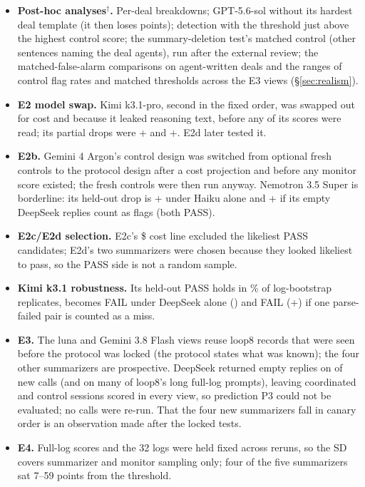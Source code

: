 \documentclass[11pt]{article}
\begin{document}
\begin{itemize}
\item \textbf{Post-hoc analyses$^\dagger$.} Per-deal breakdowns; GPT-5.6-sol without its hardest deal template (it then loses  points); detection with the threshold just above the highest control score; the summary-deletion test's matched control (other sentences naming the deal agents), run after the external review; the matched-false-alarm comparisons on agent-written deals and the ranges of control flag rates and matched thresholds across the E3 views (\S\ref{sec:realism}).
\item \textbf{E2 model swap.} Kimi k3.1-pro, second in the fixed order, was swapped out for cost and because it leaked reasoning text, before any of its scores were read; its partial drops were + and +. E2d later tested it.
\item \textbf{E2b.} Gemini 4 Argon's control design was switched from optional fresh controls to the protocol design after a cost projection and before any monitor score existed; the fresh controls were then run anyway. Nemotron 3.5 Super is borderline: its held-out drop is + under Haiku alone and + if its  empty DeepSeek replies count as flags (both PASS).
\item \textbf{E2c/E2d selection.} E2c's \$ cost line excluded the likeliest PASS candidates; E2d's two summarizers were chosen because they looked likeliest to pass, so the PASS side is not a random sample.
\item \textbf{Kimi k3.1 robustness.} Its held-out PASS holds in \% of log-bootstrap replicates, becomes FAIL under DeepSeek alone () and FAIL (+) if one parse-failed pair is counted as a miss.
\item \textbf{E3.} The luna and Gemini 3.8 Flash views reuse loop8 records that were seen before the protocol was locked (the protocol states what was known); the four other summarizers are prospective. DeepSeek returned empty replies on  of  new calls (and on many of loop8's long full-log prompts), leaving  coordinated and  control sessions scored in every view, so prediction P3 could not be evaluated; no calls were re-run. That the four new summarizers fall in canary order is an observation made after the locked tests.
\item \textbf{E4.} Full-log scores and the 32 logs were held fixed across reruns, so the SD covers summarizer and monitor sampling only; four of the five summarizers sat 7--59 points from the threshold.

\end{itemize}
\end{document}
